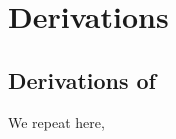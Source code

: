 \section{Derivations}

\subsection{Derivations of }
\label{sec:prop_1_apdx}
We repeat  here,
\diffebm*

